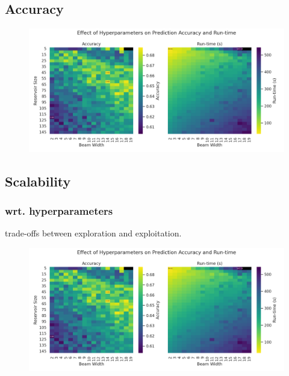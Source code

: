\documentclass[12pt,a4paper,twoside,openany]{report} \usepackage[pdfborder={0 0 0}]{hyperref}    %
\theoremstyle{definition} \newtheorem{definition}{Definition}[section]
\begin{document}
  \subsection{Accuracy}
  \label{sub:evalExtAcc}

  \begin{figure}[h]
    \begin{center}
      \includegraphics[width=\textwidth]{figs/eval/extParamsAccuracyRuntime.png}
    \end{center}
    \caption{}
    \label{fig:}
  \end{figure}

  \subsection{Scalability}
  \label{sub:evalExtScale}

  \subsubsection{wrt. hyperparameters}
  trade-offs between exploration and exploitation.

  \begin{figure}[h]
    \begin{center}
      \includegraphics[width=\textwidth]{figs/eval/extParamsAccuracyRuntime.png}
    \end{center}
    \caption{}
    \label{fig:}
  \end{figure}
\end{document}
